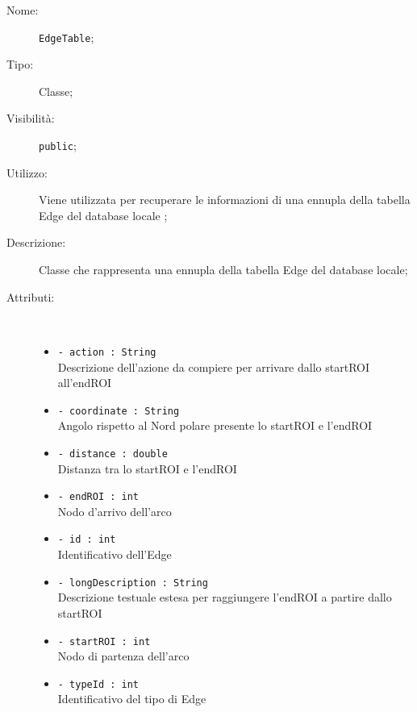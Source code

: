 \documentclass[../DefinizioneDiProdotto.tex]{subfiles}
\begin{document}
\begin{description}
	\item[Nome:] \texttt{EdgeTable};
	\item[Tipo:] Classe;
	\item[Visibilità:] \texttt{public};
	\item[Utilizzo:] Viene utilizzata per recuperare le informazioni di una ennupla della tabella Edge del database locale ;
	\item[Descrizione:] Classe che rappresenta una ennupla della tabella Edge del database locale;
	\item[Attributi:] \
	\begin{itemize}
		\item \texttt{- action : String}\\
		Descrizione dell'azione da compiere per arrivare dallo startROI all'endROI
		
		\item \texttt{- coordinate : String}\\
		Angolo rispetto al Nord polare presente lo startROI e l'endROI
		
		\item \texttt{- distance : double}\\
		Distanza tra lo startROI e l'endROI
		
		\item \texttt{- endROI : int}\\
		Nodo d'arrivo dell'arco
		
		\item \texttt{- id : int}\\
		Identificativo dell'Edge
		
		\item \texttt{- longDescription : String}\\
		Descrizione testuale estesa per raggiungere l'endROI a partire dallo startROI
		
		\item \texttt{- startROI : int}\\
		Nodo di partenza dell'arco
		
		\item \texttt{- typeId : int}\\
		Identificativo del tipo di Edge
		

\end{itemize}
\end{description}
\end{document}
